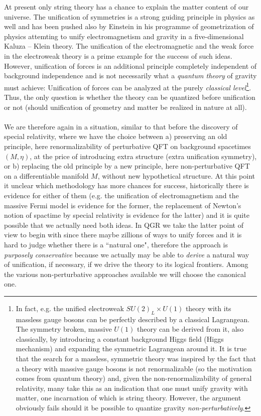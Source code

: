 \documentclass[12pt]{report}
\begin{document}
At present only string theory
has a chance to explain the matter content of our universe. The 
unification of symmetries is a strong guiding principle in physics 
as well and has been pushed also by Einstein in his programme of 
geometrization of physics attemting to unify electromagnetism and gravity
in a five-dimensional Kaluza -- Klein theory. 
The unification of the electromagnetic and the weak force in the 
electroweak theory is a prime example for the success of such ideas.
However, unification of forces is an additional principle completely 
independent of background independence and is not necessarily 
what a {\it quantum theory} of gravity must achieve: Unification
of forces can be analyzed at the purely 
{\it classical level}\footnote{In fact, e.g. the unified electroweak 
$SU(2)_L\times U(1)$
theory with its massless gauge bosons can be perfectly described by a 
classical Lagrangean. The symmetry broken, massive $U(1)$ theory can be 
derived 
from it, also classically, by introducing a constant background Higgs field
(Higgs mechanism) and expanding the symmetric Lagrangean around it. 
It is true that the search for a massless, symmetric theory was inspired 
by the fact that a theory with massive gauge bosons is not renormalizable
(so the motivation comes from quantum theory) and, given the 
non-renormalizability of general relativity, many take this as an 
indication that one must unify gravity with matter, one incarnation of 
which is 
string theory. However, the argument obviously fails should it be 
possible to quantize gravity {\it non-perturbatively}.}.
Thus, the only question is whether the theory can be quantized before
unification or not (should unification of geometry and matter be 
realized in nature at all).\\
\\
We are therefore again in a situation, similar to that
before the discovery of special relativity, where we have the choice 
between a) preserving an old principle, here renormalizability of 
perturbative QFT on background 
spacetimes $(M,\eta)$, at the price of introducing 
extra structure (extra unification symmetry), or b) replacing the old 
principle by a new principle, here 
non-perturbative QFT on a differentiable manifold $M$, 
without new hypothetical structure. At this point it unclear which 
methodology has more chances for success, historically there is evidence 
for either of them (e.g. the unification of electromagnetism and the 
massive Fermi model is evidence for the former, the replacement of 
Newton's notion of spactime by special relativity is evidence for the 
latter)
and it is quite possible that we actually need both ideas. 
In QGR we take 
the latter point of view to begin with since there maybe zillions 
of ways to unify forces and it is hard to judge whether there is a 
``natural one", therefore the approach is {\it purposely conservative}
because we actually may be able to {\it derive} a natural way of 
unification, if necessary, if we drive the theory to its logical frontiers.  
Among the various 
non-perturbative approaches available we will choose the canonical one. 
\end{document}
